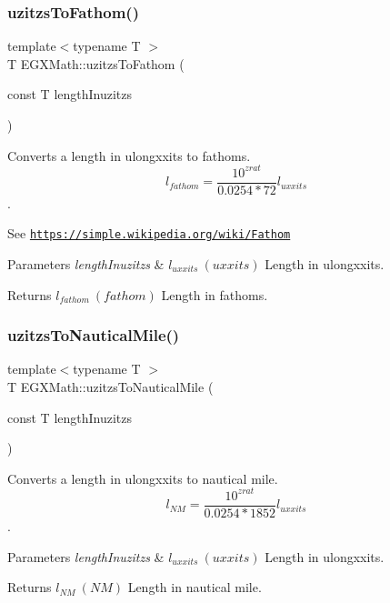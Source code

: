 \subsubsection{\texorpdfstring{uzitzs\+To\+Fathom()}{uzitzsToFathom()}}
{\footnotesize\ttfamily template$<$typename T $>$ \\
T E\+G\+X\+Math\+::uzitzs\+To\+Fathom (\begin{DoxyParamCaption}\item[{const T}]{length\+Inuzitzs }\end{DoxyParamCaption})}



Converts a length in ulongxxits to fathoms. \[ l_{fathom}= \frac{10^{zrat}}{0.0254 * 72} l_{uxxits} \]. 

See \href{https://simple.wikipedia.org/wiki/Fathom}{\tt https\+://simple.\+wikipedia.\+org/wiki/\+Fathom} 
\begin{DoxyParams}{Parameters}
{\em length\+Inuzitzs} & $ l_{uxxits}\ (uxxits)$ Length in ulongxxits. \\
\hline
\end{DoxyParams}
\begin{DoxyReturn}{Returns}
$ l_{fathom}\ (fathom)$ Length in fathoms. 
\end{DoxyReturn}
\mbox{\label{group___e_g_x_math-_conversions-_length_conversions-_non-_s_i-uzitzs-_nautical_ga71c06fc85e22f77eba0b234edefa4562}} 
\subsubsection{\texorpdfstring{uzitzs\+To\+Nautical\+Mile()}{uzitzsToNauticalMile()}}
{\footnotesize\ttfamily template$<$typename T $>$ \\
T E\+G\+X\+Math\+::uzitzs\+To\+Nautical\+Mile (\begin{DoxyParamCaption}\item[{const T}]{length\+Inuzitzs }\end{DoxyParamCaption})}



Converts a length in ulongxxits to nautical mile. \[ l_{NM}= \frac{10^{zrat}}{0.0254 * 1852} l_{uxxits} \]. 


\begin{DoxyParams}{Parameters}
{\em length\+Inuzitzs} & $ l_{uxxits}\ (uxxits)$ Length in ulongxxits. \\
\hline
\end{DoxyParams}
\begin{DoxyReturn}{Returns}
$ l_{NM}\ (NM)$ Length in nautical mile. 
\end{DoxyReturn}
